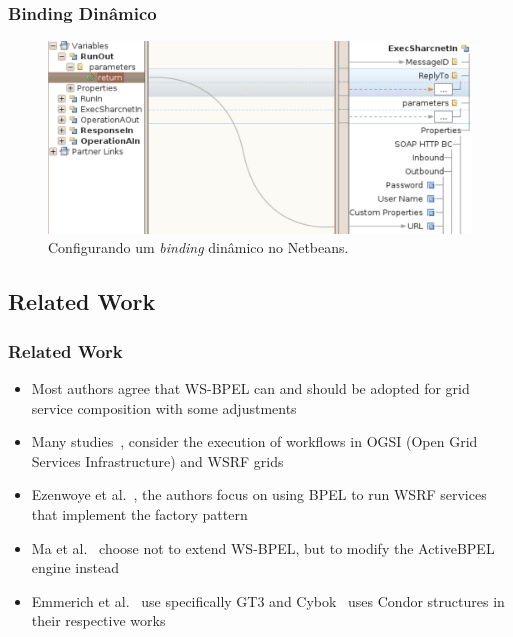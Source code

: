 \documentclass[red, cover=invisible, theme=Warsaw]{myslides}
\begin{document}
\begin{frame}[plain]\frametitle{Binding Dinâmico}
    \begin{figure}[!htb]%
    \begin{center}
	\includegraphics[scale=0.45]{imagens/BindingDinamico.pdf}
	\caption{Configurando um \textit{binding} dinâmico no Netbeans.}
    \end{center}
\end{figure}
\end{frame}

\subsection{Related Work}
\begin{frame}\frametitle{Related Work}
  \begin{itemize}
    \item Most authors agree that WS-BPEL can and should be adopted for grid service composition with some adjustments
    \item Many studies~\cite{GridServiceComposition08,Leymann06,GridEnabledWF08,Slomiski06,Tsalgatidou06}, consider the execution of workflows in OGSI (Open Grid Services Infrastructure) and WSRF grids
    \item Ezenwoye  et al.~\cite{GridServiceComposition08}, the authors focus on using BPEL to run WSRF services that implement the factory pattern
    \item Ma et al.~\cite{GridEnabledWF08} choose not to extend WS-BPEL, but to modify the ActiveBPEL engine instead
    \item Emmerich et al.~\cite{Emmerich05} use specifically GT3 and Cybok~\cite{Dieter06} uses Condor structures in their respective works
  \end{itemize}
\end{frame}
\end{document}
